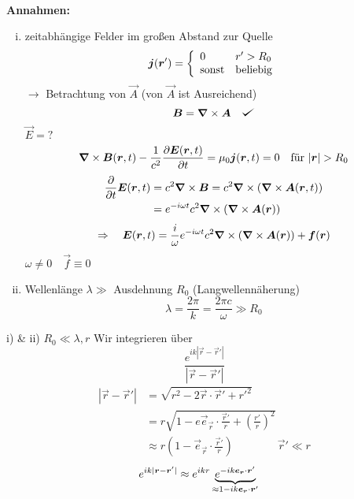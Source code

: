 \\
\textbf{Annahmen:}
\begin{enumerate}[i)]
	\item zeitabhängige Felder im großen Abstand zur Quelle
	\begin{equation*}
	\bm{j} (\bm{r}') = \left\{ \begin{array}{ll} {0} & {r' > R_0} \\ {\textrm{sonst}} & {\textrm{beliebig}} \end{array} \right.
	\end{equation*}
	$ \rightarrow $ Betrachtung von $ \vec{A} $ (von $ \vec{A} $ ist Ausreichend)
	\begin{equation*}
	\vec{B} = \vabla \times \vec{A} \quad \checkmark
	\end{equation*}
	$ \vec{E} = ? $
	\begin{align*}
	\bm{\nabla} \times \bm{B}(\bm{r},t) - \frac{1}{c^2} \frac{\partial \bm{E}(\bm{r},t)}{\partial t} = \mu_0 \bm{j}(\bm{r},t) = 0 \quad \textrm{für } |\bm{r}| > R_0
	\end{align*}
	\begin{align*}
	\frac{\partial }{\partial t} \bm{E}(\bm{r},t) &= c^2 \bm{\nabla} \times \bm{B} = c^2 \bm{\nabla} \times (\bm{\nabla} \times \bm{A}(\bm{r},t))\\
	&= e^{-i\omega t} c^2 \bm{\nabla} \times (\bm{\nabla} \times \bm{A}(\bm{r}))
	\end{align*}
	\begin{equation*}
	\Rightarrow \quad \bm{E}(\bm{r},t) = \frac{i}{\omega} e^{-i\omega t} c^2 \bm{\nabla} \times (\bm{\nabla} \times \bm{A}(\bm{r})) + \bm{f}(\bm{r})
	\end{equation*}
	$ \omega \neq 0 \quad \vec{f} \equiv 0 $
	\item Wellenlänge $ \lambda \gg $ Ausdehnung $ R_0 $ (Langwellennäherung)
	\begin{equation*}
	\lambda = \frac{2 \pi}{k} = \frac{2 \pi c}{\omega} \gg R_0
	\end{equation*}
\end{enumerate}
i) \& ii) $ R_0 \ll \lambda , r $
Wir integrieren über
\begin{equation*}
\frac{e^{i k |\vec{r} - \vec{r}'|}}{|\vec{r} - \vec{r}'|}
\end{equation*}
\begin{align*}
|\vec{r} - \vec{r}'| &= \sqrt{r^2 - 2 \vec{r} \cdot \vec{r}' + r'^2}\\
&= r \sqrt{1 - e \vec{e}_{\vec{r}} \cdot \frac{\vec{r}'}{r} + \left(\frac{r'}{r}\right)^2}\\
&\approx r (1 - \vec{e}_{\vec{r}} \cdot \frac{\vec{r}'}{r}) \qquad \qquad \vec{r}' \ll r
\end{align*}
\begin{align*}
e^{i k |\bm{r} - \bm{r}'|} &\approx e^{i k r} \underbrace{ e ^{ - i k \bm{e}_{\bm{r}} \cdot \bm{r}'}}_{\approx 1 - i k \bm{e}_{\bm{r}} \cdot \bm{r}'}
\end{align*}
